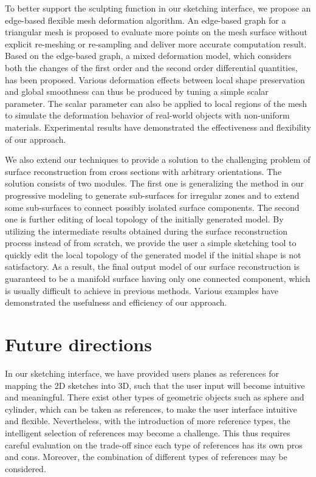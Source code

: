 To better support the sculpting function  in our sketching
interface, we propose an edge-based flexible mesh deformation
algorithm. An edge-based graph for a triangular mesh is proposed to
evaluate more points on the mesh surface without explicit re-meshing
or re-sampling and deliver more accurate computation result. Based
on the edge-based graph, a mixed deformation model, which considers
both the changes of the first order and the second order
differential quantities, has been proposed. Various deformation
effects between local shape preservation and global smoothness can
thus be produced by tuning a simple scalar parameter. The scalar
parameter can also be applied to local regions of the mesh to
simulate the deformation behavior of real-world objects with
non-uniform materials. Experimental results have demonstrated the
effectiveness and flexibility of our approach.

We also extend our techniques to provide a solution to the
challenging problem of surface reconstruction from cross sections
with arbitrary orientations. The solution consists of two modules.
The first one is generalizing the method in our progressive modeling
to generate sub-surfaces for irregular zones and to extend some
sub-surfaces to connect possibly isolated surface components. The
second one is further editing of local topology of the initially
generated model. By utilizing the intermediate results obtained
during the surface reconstruction process instead of from scratch,
we provide the user a simple sketching tool to quickly edit the
local topology of the generated model if the initial shape is not
satisfactory. As a result, the final output model of our surface
reconstruction is guaranteed to be a manifold surface having only
one connected component, which is usually difficult to achieve in
previous methods. Various examples have demonstrated the usefulness
and efficiency of our approach.


\section{Future directions}
\label{chap:conclusion_sec:2}
In our sketching interface, we have provided users planes as
references for mapping the 2D sketches into 3D, such that the user
input will become intuitive and meaningful. There exist other types
of geometric objects such as sphere and cylinder, which can be taken
as references, to make the user interface intuitive and flexible.
Nevertheless, with the introduction of more reference types, the
intelligent selection of references may become a challenge. This
thus requires careful evaluation on the trade-off since each type of
references has its own pros and cons. Moreover, the combination of
different types of references may be considered.

